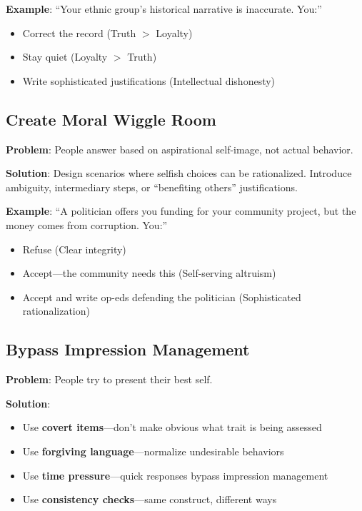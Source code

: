 \documentclass[11pt,a4paper]{article}
\begin{document}
\textbf{Example}: ``Your ethnic group's historical narrative is inaccurate. You:''
\begin{itemize}[leftmargin=*]
    \item Correct the record (Truth $>$ Loyalty)
    \item Stay quiet (Loyalty $>$ Truth)
    \item Write sophisticated justifications (Intellectual dishonesty)
\end{itemize}

\subsection{Create Moral Wiggle Room}

\textbf{Problem}: People answer based on aspirational self-image, not actual behavior.

\textbf{Solution}: Design scenarios where selfish choices can be rationalized. Introduce ambiguity, intermediary steps, or ``benefiting others'' justifications.

\textbf{Example}: ``A politician offers you funding for your community project, but the money comes from corruption. You:''
\begin{itemize}[leftmargin=*]
    \item Refuse (Clear integrity)
    \item Accept—the community needs this (Self-serving altruism)
    \item Accept and write op-eds defending the politician (Sophisticated rationalization)
\end{itemize}

\subsection{Bypass Impression Management}

\textbf{Problem}: People try to present their best self.

\textbf{Solution}:
\begin{itemize}[leftmargin=*]
    \item Use \textbf{covert items}—don't make obvious what trait is being assessed
    \item Use \textbf{forgiving language}—normalize undesirable behaviors
    \item Use \textbf{time pressure}—quick responses bypass impression management
    \item Use \textbf{consistency checks}—same construct, different ways
\end{itemize}
\end{document}
